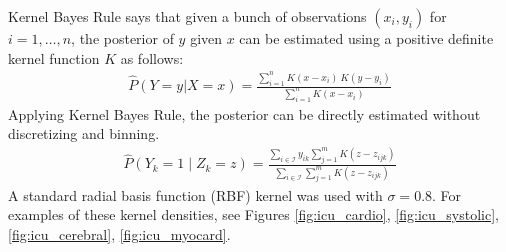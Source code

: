 Kernel Bayes Rule says that given a bunch of observations $(x_i, y_i)$ for $i = 1, \dots, n$, the posterior of $y$ given $x$ can be estimated using a positive definite kernel function $K$ as follows:
\begin{gather}
    \hat{P}(Y = y | X = x) = \frac
        {\sum_{i=1}^n K(x - x_i) \ K(y - y_i)}
        {\sum_{i=1}^n K(x - x_i)}
\end{gather}
Applying Kernel Bayes Rule, the posterior can be directly estimated without discretizing and binning.
\begin{gather}
    \hat{P}(Y_k = 1 \mid Z_k = z) = \frac
        {\sum_{i \in \mathcal{I}} y_{ik} \sum_{j=1}^m K(z - z_{ijk})}
        {\sum_{i \in \mathcal{I}} \sum_{j=1}^m K(z - z_{ijk})}
\end{gather}
A standard radial basis function (RBF) kernel was used with $\sigma = 0.8$.  For examples of these kernel densities, see Figures \ref{fig:icu_cardio}, \ref{fig:icu_systolic}, \ref{fig:icu_cerebral}, \ref{fig:icu_myocard}.

